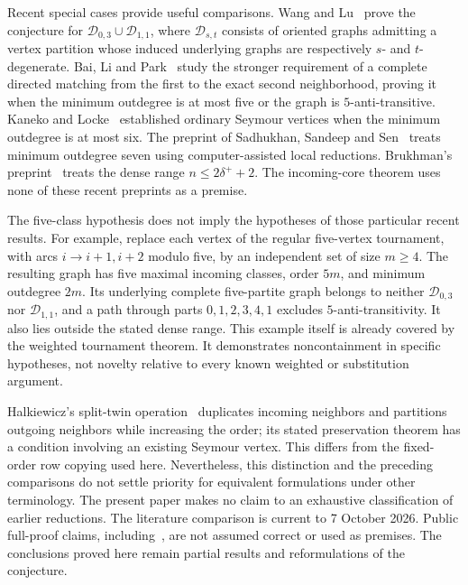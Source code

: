Recent special cases provide useful comparisons. Wang and
Lu~\cite{WangLu2026} prove the conjecture for
$\mathcal D_{0,3}\cup\mathcal D_{1,1}$, where $\mathcal D_{s,t}$ consists
of oriented graphs admitting a vertex partition whose induced underlying
graphs are respectively $s$- and $t$-degenerate. Bai, Li and
Park~\cite{BaiLiPark2026} study the stronger requirement of a complete
directed matching from the first to the exact second neighborhood, proving
it when the minimum outdegree is at most five or the graph is
$5$-anti-transitive. Kaneko and Locke~\cite{KanekoLocke2001} established
ordinary Seymour vertices when the minimum outdegree is at most six.
The preprint of Sadhukhan, Sandeep and Sen~\cite{SadhukhanEtAl2026}
treats minimum outdegree seven using computer-assisted local reductions.
Brukhman's preprint~\cite{Brukhman2026} treats the dense range
$n\leq 2\delta^++2$. The incoming-core theorem uses none of these
recent preprints as a premise.

The five-class hypothesis does not imply the hypotheses of those
particular recent results. For example, replace each vertex of the regular
five-vertex tournament, with arcs $i\to i+1,i+2$ modulo five, by an
independent set of size $m\geq4$. The resulting graph has five maximal
incoming classes, order $5m$, and minimum outdegree $2m$. Its underlying
complete five-partite graph belongs to neither
$\mathcal D_{0,3}$ nor $\mathcal D_{1,1}$, and a path through parts
$0,1,2,3,4,1$ excludes $5$-anti-transitivity. It also lies outside the
stated dense range. This example itself is already covered by the weighted
tournament theorem. It demonstrates noncontainment in specific hypotheses,
not novelty relative to every known weighted or substitution argument.

Halkiewicz's split-twin operation~\cite{Halkiewicz2026} duplicates incoming
neighbors and partitions outgoing neighbors while increasing the order;
its stated preservation theorem has a condition involving an existing
Seymour vertex. This differs from the fixed-order row copying used here.
Nevertheless, this distinction and the preceding comparisons do not settle
priority for equivalent formulations under other terminology. The present
paper makes no claim to an exhaustive classification of earlier reductions.
The literature comparison is current to 7 October 2026. Public full-proof
claims, including~\cite{GloverClaim2026}, are not assumed correct or used
as premises. The conclusions proved here remain partial results and
reformulations of the conjecture.
